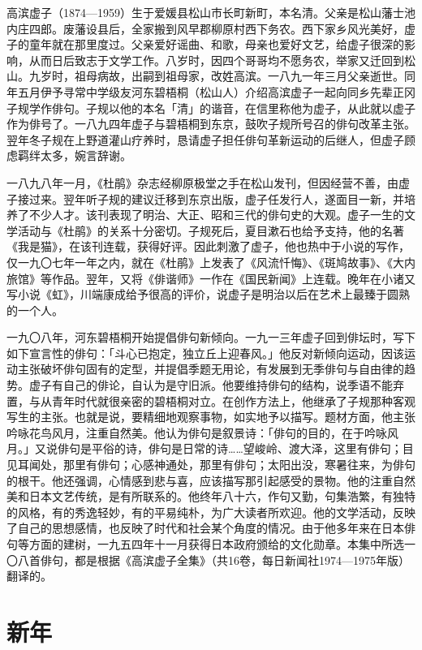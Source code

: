 {\FS
    高滨虚子（1874—1959）生于爱媛县松山市长町新町，本名清。父亲是松山藩士池内庄四郎。废藩设县后，全家搬到风早郡柳原村西下务农。西下家乡风光美好，虚子的童年就在那里度过。父亲爱好谣曲、和歌，母亲也爱好文艺，给虚子很深的影响，从而日后致志于文学工作。八岁时，因四个哥哥均不愿务农，举家又迁回到松山。九岁时，祖母病故，出嗣到祖母家，改姓高滨。一八九一年三月父亲逝世。同年五月伊予寻常中学级友河东碧梧桐（松山人）介绍高滨虚子一起向同乡先辈正冈子规学作俳句。子规以他的本名「清」的谐音，在信里称他为虚子，从此就以虚子作为俳号了。一八九四年虚子与碧梧桐到东京，鼓吹子规所号召的俳句改革主张。翌年冬子规在上野道灌山疗养时，恳请虚子担任俳句革新运动的后继人，但虚子顾虑羁绊太多，婉言辞谢。

    一八九八年一月，《杜鹃》杂志经柳原极堂之手在松山发刊，但因经营不善，由虚子接过来。翌年听子规的建议迁移到东京出版，虚子任发行人，遂面目一新，并培养了不少人才。该刊表现了明治、大正、昭和三代的俳句史的大观。虚子一生的文学活动与《杜鹃》的关系十分密切。子规死后，夏目漱石也给予支持，他的名著《我是猫》，在该刊连载，获得好评。因此刺激了虚子，他也热中于小说的写作，仅一九〇七年一年之内，就在《杜鹃》上发表了《风流忏悔》、《斑鸠故事》、《大内旅馆》等作品。翌年，又将《俳谐师》一作在《国民新闻》上连载。晚年在小诸又写小说《虹》，川端康成给予很高的评价，说虚子是明治以后在艺术上最臻于圆熟的一个人。

    一九〇八年，河东碧梧桐开始提倡俳句新倾向。一九一三年虚子回到俳坛时，写下如下宣言性的俳句：「斗心已抱定，独立丘上迎春风。」他反对新倾向运动，因该运动主张破坏俳句固有的定型，并提倡季题无用论，有发展到无季俳句与自由律的趋势。虚子有自己的俳论，自认为是守旧派。他要维持俳句的结构，说季语不能弃置，与从青年时代就很亲密的碧梧桐对立。在创作方法上，他继承了子规那种客观写生的主张。也就是说，要精细地观察事物，如实地予以描写。题材方面，他主张吟咏花鸟风月，注重自然美。他认为俳句是叙景诗：「俳句的目的，在于吟咏风月。」又说俳句是平俗的诗，俳句是日常的诗……望峻岭、渡大泽，这里有俳句；目见耳闻处，那里有俳句；心感神通处，那里有俳句；太阳出没，寒暑往来，为俳句的根干。他还强调，心情感到悲与喜，应该描写那引起感受的景物。他的注重自然美和日本文艺传统，是有所联系的。他终年八十六，作句又勤，句集浩繁，有独特的风格，有的秀逸轻妙，有的平易纯朴，为广大读者所欢迎。他的文学活动，反映了自己的思想感情，也反映了时代和社会某个角度的情况。由于他多年来在日本俳句等方面的建树，一九五四年十一月获得日本政府颁给的文化勋章。本集中所选一〇八首俳句，都是根据《高滨虚子全集》（共16卷，每日新闻社1974—1975年版）翻译的。
}

\newpage

\section{\FK 新年}


